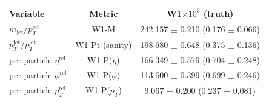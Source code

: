 \begin{ruledtabular}
  \begin{tabular}{lcc}
  \textbf{Variable} & \textbf{Metric} & \textbf{W1}$\times 10^3$ (truth) \\
  \hline
  $m_\mathrm{jet}/p_T^\mathrm{jet}$ & W1-M & 242.157 $\pm$ 0.210 (0.176 $\pm$ 0.066) \\
  $p_T^\mathrm{jet}/p_T^\mathrm{jet}$ & W1-Pt (sanity) & 198.680 $\pm$ 0.648 (0.375 $\pm$ 0.136) \\
  per-particle $\eta^\mathrm{rel}$ & W1-P($\eta$) & 166.349 $\pm$ 0.579 (0.704 $\pm$ 0.248) \\
  per-particle $\phi^\mathrm{rel}$ & W1-P($\phi$) & 113.600 $\pm$ 0.399 (0.699 $\pm$ 0.246) \\
  per-particle $p_T^\mathrm{rel}$ & W1-P($p_T$) & 9.067 $\pm$ 0.200 (0.237 $\pm$ 0.081) \\
  \end{tabular}
\end{ruledtabular}
